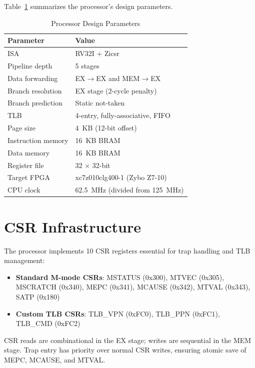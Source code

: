\documentclass[conference]{IEEEtran}
\begin{document}
Table~\ref{tab:params} summarizes the processor's design parameters.

\begin{table}[htbp]
\caption{Processor Design Parameters}
\begin{center}
\begin{tabular}{|l|l|}
\hline
\textbf{Parameter} & \textbf{Value} \\
\hline
ISA & RV32I + Zicsr \\
Pipeline depth & 5 stages \\
Data forwarding & EX$\rightarrow$EX and MEM$\rightarrow$EX \\
Branch resolution & EX stage (2-cycle penalty) \\
Branch prediction & Static not-taken \\
TLB & 4-entry, fully-associative, FIFO \\
Page size & 4~KB (12-bit offset) \\
Instruction memory & 16~KB BRAM \\
Data memory & 16~KB BRAM \\
Register file & 32 $\times$ 32-bit \\
Target FPGA & xc7z010clg400-1 (Zybo Z7-10) \\
CPU clock & 62.5~MHz (divided from 125~MHz) \\
\hline
\end{tabular}
\label{tab:params}
\end{center}
\end{table}

\section{CSR Infrastructure}

The processor implements 10 CSR registers essential for trap handling and TLB management:

\begin{itemize}
    \item \textbf{Standard M-mode CSRs}: MSTATUS (0x300), MTVEC (0x305), MSCRATCH (0x340), MEPC (0x341), MCAUSE (0x342), MTVAL (0x343), SATP (0x180)
    \item \textbf{Custom TLB CSRs}: TLB\_VPN (0xFC0), TLB\_PPN (0xFC1), TLB\_CMD (0xFC2)
\end{itemize}

CSR reads are combinational in the EX stage; writes are sequential in the MEM stage. Trap entry has priority over normal CSR writes, ensuring atomic save of MEPC, MCAUSE, and MTVAL.
\end{document}
